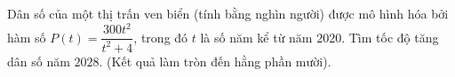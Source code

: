 \begin{bt}%
	Dân số của một thị trấn ven biển (tính bằng nghìn người) được mô hình hóa bởi hàm số $P(t)=\dfrac{300t^2}{t^2+4}$, trong đó $t$ là số năm kể từ năm $2020$. Tìm tốc độ tăng dân số năm $2028$. (Kết quả làm tròn đến hằng phần mười).
	
\end{bt}

